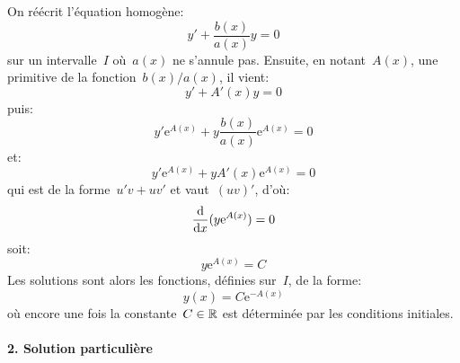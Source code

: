 On réécrit l'équation homogène:
\begin{equation}
y' + \frac{b(x)}{a(x)} y = 0
\end{equation}
sur un intervalle~$I$ où~$a(x)$ ne s'annule pas. Ensuite, en notant~$A(x)$, une primitive de la fonction~$b(x)/a(x)$, il vient:
\begin{equation}
y' + A'(x) y =0
\end{equation}
puis:
\begin{equation}
y' \mathrm{e}^{A(x)} + y \frac{b(x)}{a(x)} \mathrm{e}^{A(x)} =0
\end{equation}
et:
\begin{equation}
y' \mathrm{e}^{A(x)} + y A'(x) \mathrm{e}^{A(x)}=0
\end{equation}
qui est de la forme~$u' v + u v'$ et vaut~$ (u v)'$, d'où:
\begin{equation}
\frac{\mathrm d}{\text{d} x}(y \mathrm{e}^{A(x)})=0
\end{equation}
soit:
\begin{equation}
y \mathrm{e}^{A(x)} = C
\end{equation}
Les solutions sont alors les fonctions, définies sur~$I$, de la forme:
\begin{equation}\label{eq:ed:forme}
y(x) = C \mathrm{e}^{-A(x)}
\end{equation}
où encore une fois la constante~$C\in\mathbb R$ est déterminée par les conditions initiales. 

\medskip
\paragraph{2. Solution particulière}

